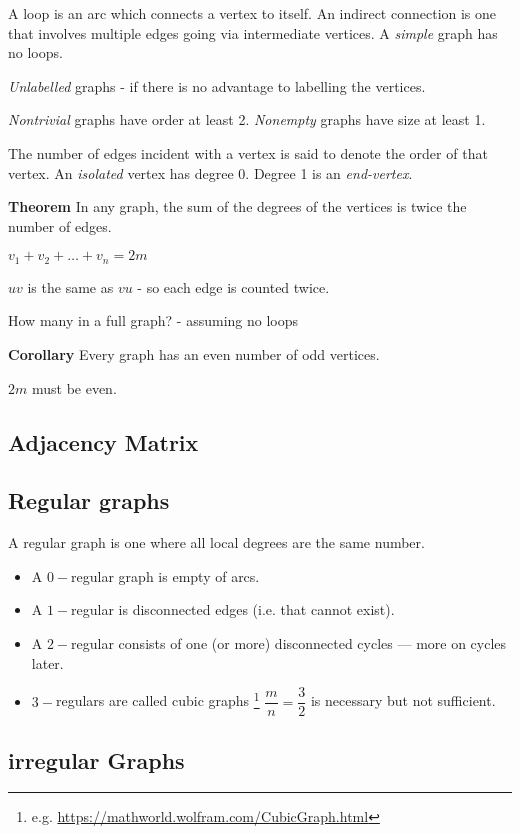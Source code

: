 A loop is an arc which connects a vertex to itself. An indirect connection is one that involves multiple edges going via intermediate vertices. A \textit{simple} graph has no loops. 

\textit{Unlabelled} graphs - if there is no advantage to labelling the vertices. 

\textit{Nontrivial} graphs have order at least 2. \textit{Nonempty} graphs have size at least 1. 

The number of edges incident with a vertex is said to denote the order of that vertex. An \textit{isolated} vertex has degree 0. Degree 1 is an \textit{end-vertex}. 

\textbf{Theorem} In any graph, the sum of the degrees of the vertices is twice the number of edges. 

$v_1 + v_2 + \ldots + v_n = 2m$ 

$uv$ is the same as $vu$ - so each edge is counted twice. 

How many in a full graph? - assuming no loops 

\textbf{Corollary} Every graph has an even number of odd vertices. 

$2m$ must be even. 

\subsection{Adjacency Matrix}

\subsection{Regular graphs}

A regular graph is one where all local degrees are the same number. 

\begin{itemize}
	\item A $0-$regular graph is empty of arcs. 
	\item A $1-$regular is disconnected edges (i.e. that cannot exist). 	
	\item  A $2-$regular consists of one (or more) disconnected cycles --- more on cycles later. 
	\item $3-$regulars are called cubic graphs \footnote{e.g. \url{https://mathworld.wolfram.com/CubicGraph.html}} $\dfrac{m}{n} = \dfrac{3}{2}$ is necessary but not sufficient. 
\end{itemize}

\subsection{irregular Graphs}

